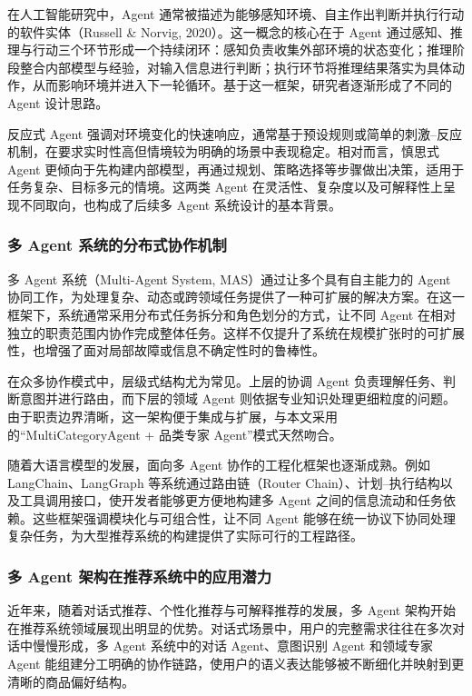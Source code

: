 \documentclass{nkuthesis}
\begin{document}
在人工智能研究中，Agent 通常被描述为能够感知环境、自主作出判断并执行行动的软件实体（Russell \& Norvig, 2020）。这一概念的核心在于 Agent 通过感知、推理与行动三个环节形成一个持续闭环：感知负责收集外部环境的状态变化；推理阶段整合内部模型与经验，对输入信息进行判断；执行环节将推理结果落实为具体动作，从而影响环境并进入下一轮循环。基于这一框架，研究者逐渐形成了不同的 Agent 设计思路。

反应式 Agent 强调对环境变化的快速响应，通常基于预设规则或简单的刺激–反应机制，在要求实时性高但情境较为明确的场景中表现稳定。相对而言，慎思式 Agent 更倾向于先构建内部模型，再通过规划、策略选择等步骤做出决策，适用于任务复杂、目标多元的情境。这两类 Agent 在灵活性、复杂度以及可解释性上呈现不同取向，也构成了后续多 Agent 系统设计的基本背景。

\subsubsection{多 Agent 系统的分布式协作机制}

多 Agent 系统（Multi-Agent System, MAS）通过让多个具有自主能力的 Agent 协同工作，为处理复杂、动态或跨领域任务提供了一种可扩展的解决方案。在这一框架下，系统通常采用分布式任务拆分和角色划分的方式，让不同 Agent 在相对独立的职责范围内协作完成整体任务。这样不仅提升了系统在规模扩张时的可扩展性，也增强了面对局部故障或信息不确定性时的鲁棒性。

在众多协作模式中，层级式结构尤为常见。上层的协调 Agent 负责理解任务、判断意图并进行路由，而下层的领域 Agent 则依据专业知识处理更细粒度的问题。由于职责边界清晰，这一架构便于集成与扩展，与本文采用的“MultiCategoryAgent + 品类专家 Agent”模式天然吻合。

随着大语言模型的发展，面向多 Agent 协作的工程化框架也逐渐成熟。例如 LangChain、LangGraph 等系统通过路由链（Router Chain）、计划–执行结构以及工具调用接口，使开发者能够更方便地构建多 Agent 之间的信息流动和任务依赖。这些框架强调模块化与可组合性，让不同 Agent 能够在统一协议下协同处理复杂任务，为大型推荐系统的构建提供了实际可行的工程路径。

\subsubsection{多 Agent 架构在推荐系统中的应用潜力}

近年来，随着对话式推荐、个性化推荐与可解释推荐的发展，多 Agent 架构开始在推荐系统领域展现出明显的优势。对话式场景中，用户的完整需求往往在多次对话中慢慢形成，多 Agent 系统中的对话 Agent、意图识别 Agent 和领域专家 Agent 能组建分工明确的协作链路，使用户的语义表达能够被不断细化并映射到更清晰的商品偏好结构。
\end{document}
